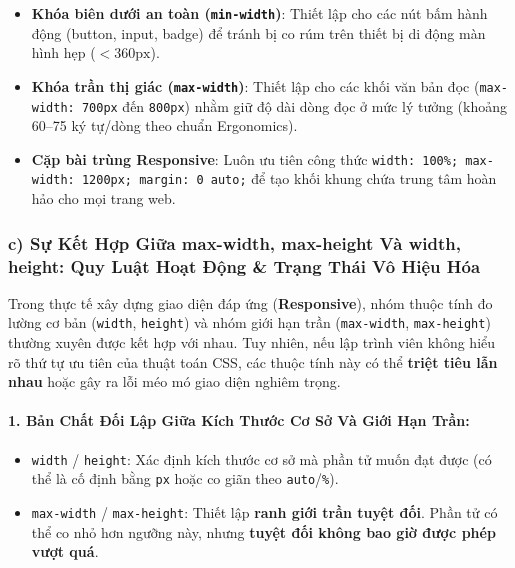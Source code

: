 \documentclass[11pt,oneside]{book}
\newcommand{\codeinline}[1]{\textcolor{accentOrange}{\texttt{#1}}}
\newcommand{\term}[1]{\textbf{\textcolor{primaryBlue}{#1}}}
\begin{document}
\begin{tipBox}
\begin{itemize}[leftmargin=1.2em, itemsep=3pt, parsep=0pt]
    \item \textbf{Khóa biên dưới an toàn (\codeinline{min-width})}: Thiết lập cho các nút bấm hành động (button, input, badge) để tránh bị co rúm trên thiết bị di động màn hình hẹp ($< 360\text{px}$).
    \item \textbf{Khóa trần thị giác (\codeinline{max-width})}: Thiết lập cho các khối văn bản đọc (\codeinline{max-width: 700px} đến \codeinline{800px}) nhằm giữ độ dài dòng đọc ở mức lý tưởng (khoảng 60--75 ký tự/dòng theo chuẩn Ergonomics).
    \item \textbf{Cặp bài trùng Responsive}: Luôn ưu tiên công thức \codeinline{width: 100\%; max-width: 1200px; margin: 0 auto;} để tạo khối khung chứa trung tâm hoàn hảo cho mọi trang web.
\end{itemize}
\end{tipBox}

\subsubsection{c) Sự Kết Hợp Giữa max-width, max-height Và width, height: Quy Luật Hoạt Động \& Trạng Thái Vô Hiệu Hóa}
\label{subsubsec:combination_max_and_dimensions}

Trong thực tế xây dựng giao diện đáp ứng (\term{Responsive}), nhóm thuộc tính đo lường cơ bản (\codeinline{width}, \codeinline{height}) và nhóm giới hạn trần (\codeinline{max-width}, \codeinline{max-height}) thường xuyên được kết hợp với nhau. Tuy nhiên, nếu lập trình viên không hiểu rõ thứ tự ưu tiên của thuật toán CSS, các thuộc tính này có thể \textbf{triệt tiêu lẫn nhau} hoặc gây ra lỗi méo mó giao diện nghiêm trọng.

\paragraph{1. Bản Chất Đối Lập Giữa Kích Thước Cơ Sở Và Giới Hạn Trần:}
\begin{itemize}[leftmargin=1.5em, itemsep=3pt, parsep=0pt]
    \item \codeinline{width} / \codeinline{height}: Xác định kích thước cơ sở mà phần tử muốn đạt được (có thể là cố định bằng \codeinline{px} hoặc co giãn theo \codeinline{auto}/\codeinline{\%}).
    \item \codeinline{max-width} / \codeinline{max-height}: Thiết lập \textbf{ranh giới trần tuyệt đối}. Phần tử có thể co nhỏ hơn ngưỡng này, nhưng \textbf{tuyệt đối không bao giờ được phép vượt quá}.
\end{itemize}
\end{document}
